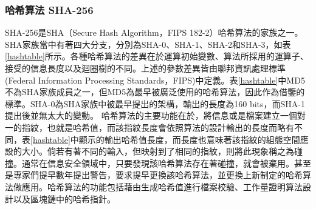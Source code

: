 				\subsubsection{哈希算法 SHA-256}
				SHA-256是SHA（Secure Hash Algorithm，FIPS 182-2）\supercite{DBLP:conf/fse/KhovratovichRS12}哈希算法的家族之一。SHA家族當中有著四大分支，分別為SHA-0、SHA-1、SHA-2和SHA-3，如表\ref{hashtable}所示。各種哈希算法的差異在於運算初始變數、算法所採用的運算子、接受的信息長度以及迴圈樹的不同。上述的參數差異皆由聯邦資訊處理標準(Federal Information Processing Standards，FIPS)中定義。表\ref{hashtable}中MD5不為SHA家族成員之一，但MD5為最早被廣泛使用的哈希算法，因此作為借鑒的標準。SHA-0為SHA家族中被最早提出的架構，輸出的長度為160 bits，而SHA-1提出後並無太大的變動。
				哈希算法的主要功能在於，將信息或是檔案建立一個對一的指紋，也就是哈希值，而該指紋長度會依照算法的設計輸出的長度而略有不同，表\ref{hashtable}中顯示的輸出哈希值長度，而長度也意味著該指紋的組態空間應設的大小。倘若有著不同的輸入，但映射到了相同的指紋，則將此現象稱之為碰撞。通常在信息安全領域中，只要發現該哈希算法存在著碰撞，就會被棄用。甚至是專家們提早數年提出警告，要求提早更換該哈希算法，並更換上新制定的哈希算法做應用。哈希算法的功能包括藉由生成哈希值進行檔案校驗、工作量證明算法設計以及區塊鏈中的哈希指針。
